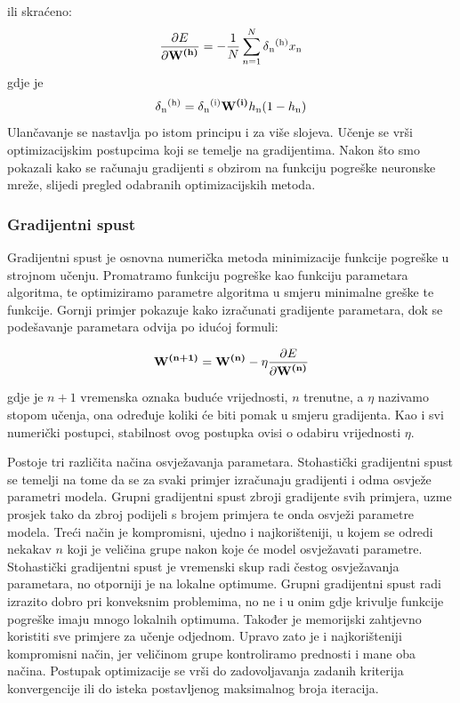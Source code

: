 \documentclass[times, utf8, diplomski]{fer}
\begin{document}
ili skraćeno:
\begin{equation}
	\frac{\partial E}{\partial \textbf{W\textsuperscript{(h)}}} = -\frac{1}{N}\sum_{n=1}^{N} \delta\textsubscript{n}\textsuperscript{(h)}x\textsubscript{n}
\end{equation}
gdje je 
\begin{equation}
\delta\textsubscript{n}\textsuperscript{(h)} = \delta\textsubscript{n}\textsuperscript{(i)}\textbf{W\textsuperscript{(i)}}h\textsubscript{n}(1 - h\textsubscript{n})
\end{equation}
Ulančavanje se nastavlja po istom principu i za više slojeva. Učenje se vrši optimizacijskim postupcima koji se temelje na gradijentima. Nakon što smo pokazali kako se računaju gradijenti s obzirom na funkciju pogreške neuronske mreže, slijedi pregled odabranih optimizacijskih metoda.

\subsubsection{Gradijentni spust}
Gradijentni spust je osnovna numerička metoda minimizacije funkcije pogreške u strojnom učenju. Promatramo funkciju pogreške kao funkciju parametara algoritma, te optimiziramo parametre algoritma u smjeru minimalne greške te funkcije. Gornji primjer pokazuje kako izračunati gradijente parametara, dok se podešavanje parametara odvija po idućoj formuli:

\begin{equation}
\textbf{W\textsuperscript{(n+1)}} = \textbf{W\textsuperscript{(n)}} - \eta\frac{\partial E}{\partial \textbf{W\textsuperscript{(n)}}}
\end{equation}

gdje je $n+1$ vremenska oznaka buduće vrijednosti, $n$ trenutne, a $\eta$ nazivamo stopom učenja, ona određuje koliki će biti pomak u smjeru gradijenta. Kao i svi numerički postupci, stabilnost ovog postupka ovisi o  odabiru vrijednosti $\eta$. \par

Postoje tri različita načina osvježavanja parametara. Stohastički gradijentni spust se temelji na tome da se za svaki primjer izračunaju gradijenti i odma osvježe parametri modela. Grupni gradijentni spust zbroji gradijente svih primjera, uzme prosjek tako da zbroj podijeli s brojem primjera te onda osvježi parametre modela. Treći način je kompromisni, ujedno i najkorišteniji, u kojem se odredi nekakav $n$ koji je veličina grupe nakon koje će model osvježavati parametre. Stohastički gradijentni spust je vremenski skup radi čestog osvježavanja parametara, no otporniji je na lokalne optimume. Grupni gradijentni spust radi izrazito dobro pri konveksnim problemima, no ne i u onim gdje krivulje funkcije pogreške imaju mnogo lokalnih optimuma. Također je memorijski zahtjevno koristiti sve primjere za učenje odjednom. Upravo zato je i najkorišteniji kompromisni način, jer veličinom grupe kontroliramo prednosti i mane oba načina. Postupak optimizacije se vrši do zadovoljavanja zadanih kriterija konvergencije ili do isteka postavljenog maksimalnog broja iteracija.\par
\end{document}
